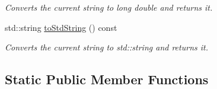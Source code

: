 \begin{DoxyCompactItemize}
\begin{DoxyCompactList}\small\item\em Converts the current string to long double and returns it. \end{DoxyCompactList}\item 
std\+::string \mbox{\hyperlink{class_a_string_a4854e78fcc05431efb96eaa99e271fea}{to\+Std\+String}} () const
\begin{DoxyCompactList}\small\item\em Converts the current string to std\+::string and returns it. \end{DoxyCompactList}\end{DoxyCompactItemize}
\subsection*{Static Public Member Functions}
